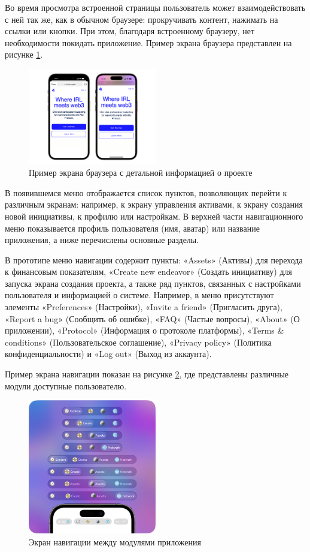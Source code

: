 \documentclass[
    14pt,
    specialist,
    candidate, %
    subf, %
    href,
    dotsinheaders=false
]{disser}
\begin{document}
Во время просмотра встроенной страницы пользователь может взаимодействовать с ней так же, как в обычном браузере: прокручивать контент, нажимать на ссылки или кнопки. При этом, благодаря встроенному браузеру, нет необходимости покидать приложение. Пример экрана браузера представлен на рисунке \ref{fig:app-browser}.

\begin{figure}[h]
  \centering
  \includegraphics[width=0.5\textwidth]{./assets/app-browser.png}
  \caption{Пример экрана браузера с детальной информацией о проекте}
  \label{fig:app-browser}
\end{figure}

В появившемся меню отображается список пунктов, позволяющих перейти к различным экранам: например, к экрану управления активами, к экрану создания новой инициативы, к профилю или настройкам. В верхней части навигационного меню показывается профиль пользователя (имя, аватар) или название приложения, а ниже перечислены основные разделы.

В прототипе меню навигации содержит пункты: «Assets» (Активы) для перехода к финансовым показателям, «Create new endeavor» (Создать инициативу) для запуска экрана создания проекта, а также ряд пунктов, связанных с настройками пользователя и информацией о системе. Например, в меню присутствуют элементы «Preferences» (Настройки), «Invite a friend» (Пригласить друга), «Report a bug» (Сообщить об ошибке), «FAQ» (Частые вопросы), «About» (О приложении), «Protocol» (Информация о протоколе платформы), «Terms \& conditions» (Пользовательское соглашение), «Privacy policy» (Политика конфиденциальности) и «Log out» (Выход из аккаунта).

Пример экрана навигации показан на рисунке \ref{fig:app-navigation}, где представлены различные модули доступные пользователю.

\begin{figure}[h]
  \centering
  \includegraphics[width=0.5\textwidth]{./assets/app-navigation.png}
  \caption{Экран навигации между модулями приложения}
  \label{fig:app-navigation}
\end{figure}
\end{document}
